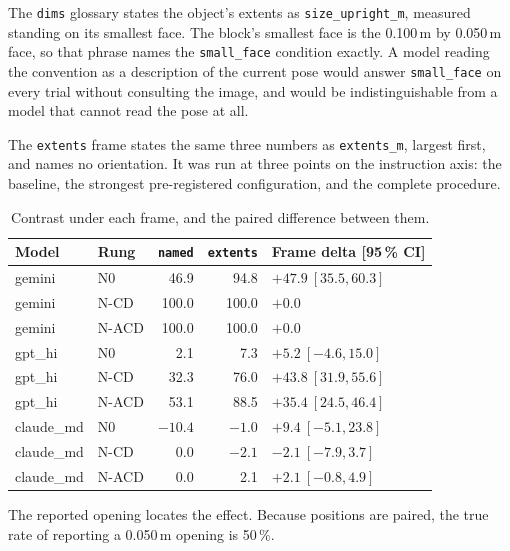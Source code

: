 The \texttt{dims} glossary states the object's extents as
\texttt{size\_upright\_m}, measured standing on its smallest face. The block's
smallest face is the 0.100\,m by 0.050\,m face, so that phrase names the
\texttt{small\_face} condition exactly. A model reading the convention as a
description of the current pose would answer \texttt{small\_face} on every
trial without consulting the image, and would be indistinguishable from a model
that cannot read the pose at all.

The \texttt{extents} frame states the same three numbers as
\texttt{extents\_m}, largest first, and names no orientation. It was run at
three points on the instruction axis: the baseline, the strongest
pre-registered configuration, and the complete procedure.

\begin{table}[h]
\caption{Contrast under each frame, and the paired difference between them.}
\label{tab:ex2-frame}
\centering
\begin{tabular}{llrrl}
\toprule
Model & Rung & \texttt{named} & \texttt{extents} & Frame delta [95\,\% CI] \\
\midrule
gemini    & N0    &  46.9 &  94.8 & $+47.9\ [35.5, 60.3]$ \\
gemini    & N-CD  & 100.0 & 100.0 & $+0.0$ \\
gemini    & N-ACD & 100.0 & 100.0 & $+0.0$ \\
gpt\_hi   & N0    &   2.1 &   7.3 & $+5.2\ [-4.6, 15.0]$ \\
gpt\_hi   & N-CD  &  32.3 &  76.0 & $+43.8\ [31.9, 55.6]$ \\
gpt\_hi   & N-ACD &  53.1 &  88.5 & $+35.4\ [24.5, 46.4]$ \\
claude\_md& N0    & $-10.4$ & $-1.0$ & $+9.4\ [-5.1, 23.8]$ \\
claude\_md& N-CD  &   0.0 & $-2.1$ & $-2.1\ [-7.9, 3.7]$ \\
claude\_md& N-ACD &   0.0 &   2.1 & $+2.1\ [-0.8, 4.9]$ \\
\bottomrule
\end{tabular}
\end{table}

The reported opening locates the effect. Because positions are paired, the true
rate of reporting a 0.050\,m opening is 50\,\%.

